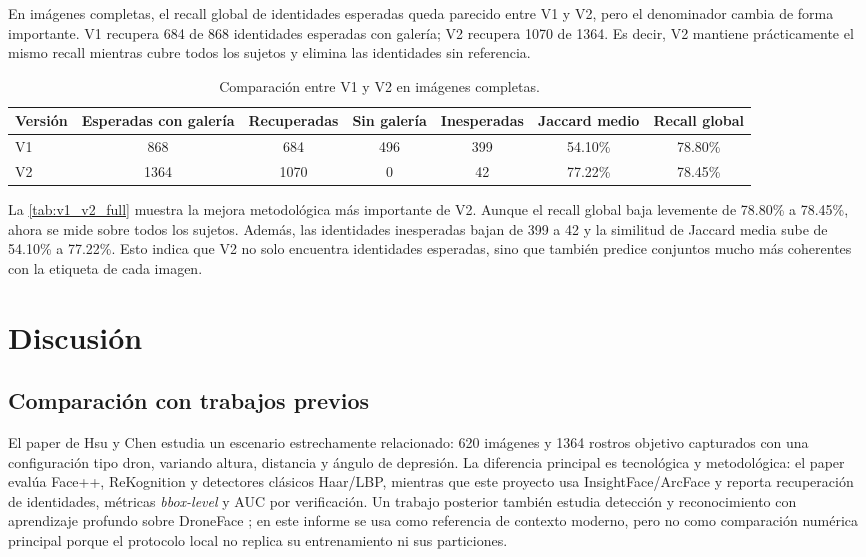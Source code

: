 \documentclass[11pt]{article}
\begin{document}
En im\'agenes completas, el recall global de identidades esperadas queda parecido entre V1 y V2, pero el denominador cambia de forma importante. V1 recupera 684 de 868 identidades esperadas con galer\'ia; V2 recupera 1070 de 1364. Es decir, V2 mantiene pr\'acticamente el mismo recall mientras cubre todos los sujetos y elimina las identidades sin referencia.

\begin{table}[H]
\centering
\caption{Comparaci\'on entre V1 y V2 en im\'agenes completas.}
\label{tab:v1_v2_full}
\begin{adjustbox}{max width=\textwidth}
\begin{tabular}{lcccccc}
\toprule
Versi\'on & Esperadas con galer\'ia & Recuperadas & Sin galer\'ia & Inesperadas & Jaccard medio & Recall global \\
\midrule
V1 & 868 & 684 & 496 & 399 & 54.10\% & 78.80\% \\
V2 & 1364 & 1070 & 0 & 42 & 77.22\% & 78.45\% \\
\bottomrule
\end{tabular}
\end{adjustbox}
\end{table}

La \autoref{tab:v1_v2_full} muestra la mejora metodol\'ogica m\'as importante de V2. Aunque el recall global baja levemente de 78.80\% a 78.45\%, ahora se mide sobre todos los sujetos. Adem\'as, las identidades inesperadas bajan de 399 a 42 y la similitud de Jaccard media sube de 54.10\% a 77.22\%. Esto indica que V2 no solo encuentra identidades esperadas, sino que tambi\'en predice conjuntos mucho m\'as coherentes con la etiqueta de cada imagen.

\section{Discusi\'on}
\label{sec:discusion}

\subsection{Comparaci\'on con trabajos previos}
\label{sec:comparacion_previos}

El paper de Hsu y Chen \cite{hsu2015issues} estudia un escenario estrechamente relacionado: 620 im\'agenes y 1364 rostros objetivo capturados con una configuraci\'on tipo dron, variando altura, distancia y \'angulo de depresi\'on. La diferencia principal es tecnol\'ogica y metodol\'ogica: el paper eval\'ua Face++, ReKognition y detectores cl\'asicos Haar/LBP, mientras que este proyecto usa InsightFace/ArcFace y reporta recuperaci\'on de identidades, m\'etricas \textit{bbox-level} y AUC por verificaci\'on. Un trabajo posterior tambi\'en estudia detecci\'on y reconocimiento con aprendizaje profundo sobre DroneFace \cite{rostami2022deep}; en este informe se usa como referencia de contexto moderno, pero no como comparaci\'on num\'erica principal porque el protocolo local no replica su entrenamiento ni sus particiones.
\end{document}
